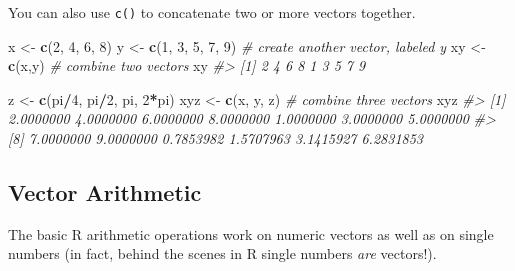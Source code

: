 \documentclass[]{book}
\newenvironment{Shaded}{\begin{snugshade}}{\end{snugshade}}
\newcommand{\CommentTok}[1]{\textcolor[rgb]{0.56,0.35,0.01}{\textit{#1}}}
\newcommand{\DecValTok}[1]{\textcolor[rgb]{0.00,0.00,0.81}{#1}}
\newcommand{\KeywordTok}[1]{\textcolor[rgb]{0.13,0.29,0.53}{\textbf{#1}}}
\newcommand{\NormalTok}[1]{#1}
\newcommand{\OperatorTok}[1]{\textcolor[rgb]{0.81,0.36,0.00}{\textbf{#1}}}
\newcommand{\StringTok}[1]{\textcolor[rgb]{0.31,0.60,0.02}{#1}}
\theoremstyle{definition}
\theoremstyle{definition}
\theoremstyle{definition}
\theoremstyle{remark}
\begin{document}
You can also use \texttt{c()} to concatenate two or more vectors
together.

\begin{Shaded}
\begin{Highlighting}[]
\NormalTok{x <-}\StringTok{ }\KeywordTok{c}\NormalTok{(}\DecValTok{2}\NormalTok{, }\DecValTok{4}\NormalTok{, }\DecValTok{6}\NormalTok{, }\DecValTok{8}\NormalTok{)}
\NormalTok{y <-}\StringTok{ }\KeywordTok{c}\NormalTok{(}\DecValTok{1}\NormalTok{, }\DecValTok{3}\NormalTok{, }\DecValTok{5}\NormalTok{, }\DecValTok{7}\NormalTok{, }\DecValTok{9}\NormalTok{)  }\CommentTok{# create another vector, labeled y}
\NormalTok{xy <-}\StringTok{ }\KeywordTok{c}\NormalTok{(x,y)  }\CommentTok{# combine two vectors}
\NormalTok{xy}
\CommentTok{#> [1] 2 4 6 8 1 3 5 7 9}

\NormalTok{z <-}\StringTok{ }\KeywordTok{c}\NormalTok{(pi}\OperatorTok{/}\DecValTok{4}\NormalTok{, pi}\OperatorTok{/}\DecValTok{2}\NormalTok{, pi, }\DecValTok{2}\OperatorTok{*}\NormalTok{pi)}
\NormalTok{xyz <-}\StringTok{ }\KeywordTok{c}\NormalTok{(x, y, z)  }\CommentTok{# combine three vectors}
\NormalTok{xyz}
\CommentTok{#>  [1] 2.0000000 4.0000000 6.0000000 8.0000000 1.0000000 3.0000000 5.0000000}
\CommentTok{#>  [8] 7.0000000 9.0000000 0.7853982 1.5707963 3.1415927 6.2831853}
\end{Highlighting}
\end{Shaded}

\hypertarget{vector-arithmetic}{%
\subsection{Vector Arithmetic}\label{vector-arithmetic}}

The basic R arithmetic operations work on numeric vectors as well as on
single numbers (in fact, behind the scenes in R single numbers
\emph{are} vectors!).
\end{document}
